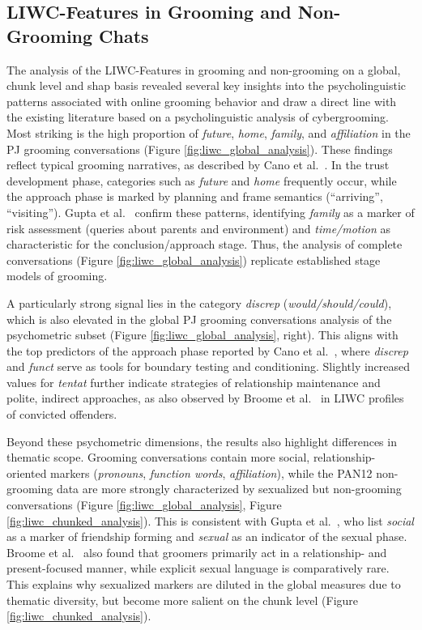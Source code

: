 \subsection{LIWC-Features in Grooming and Non-Grooming Chats}

The analysis of the LIWC-Features in grooming and non-grooming on a global, chunk level and shap basis revealed several key insights into the psycholinguistic patterns associated with online grooming behavior and draw a direct line with the existing literature based on a psycholinguistic analysis of cybergrooming. Most striking is the high proportion of \textit{future}, \textit{home}, \textit{family}, and \textit{affiliation} in the PJ grooming conversations (Figure \ref{fig:liwc_global_analysis}). These findings reflect typical grooming narratives, as described by Cano et al.~\cite{Cano2014}. In the trust development phase, categories such as \textit{future} and \textit{home} frequently occur, while the approach phase is marked by planning and frame semantics (``arriving'', ``visiting''). Gupta et al.~\cite{gupta2012characterizingpedophileconversationsinternet} confirm these patterns, identifying \textit{family} as a marker of risk assessment (queries about parents and environment) and \textit{time/motion} as characteristic for the conclusion/approach stage. Thus, the analysis of complete conversations (Figure \ref{fig:liwc_global_analysis}) replicate established stage models of grooming.  

A particularly strong signal lies in the category \textit{discrep} (\textit{would/should/could}), which is also elevated in the global PJ grooming conversations analysis of the psychometric subset (Figure \ref{fig:liwc_global_analysis}, right). This aligns with the top predictors of the approach phase reported by Cano et al.~\cite{Cano2014}, where \textit{discrep} and \textit{funct} serve as tools for boundary testing and conditioning. Slightly increased values for \textit{tentat} further indicate strategies of relationship maintenance and polite, indirect approaches, as also observed by Broome et al.~\cite{broome2020psycholinguistic} in LIWC profiles of convicted offenders.

Beyond these psychometric dimensions, the results also highlight differences in thematic scope. Grooming conversations contain more social, relationship-oriented markers (\textit{pronouns}, \textit{function words}, \textit{affiliation}), while the PAN12 non-grooming data are more strongly characterized by sexualized but non-grooming conversations (Figure \ref{fig:liwc_global_analysis}, Figure \ref{fig:liwc_chunked_analysis}). This is consistent with Gupta et al.~\cite{gupta2012characterizingpedophileconversationsinternet}, who list \textit{social} as a marker of friendship forming and \textit{sexual} as an indicator of the sexual phase. Broome et al.~\cite{broome2020psycholinguistic} also found that groomers primarily act in a relationship- and present-focused manner, while explicit sexual language is comparatively rare. This explains why sexualized markers are diluted in the global measures due to thematic diversity, but become more salient on the chunk level (Figure \ref{fig:liwc_chunked_analysis}).

